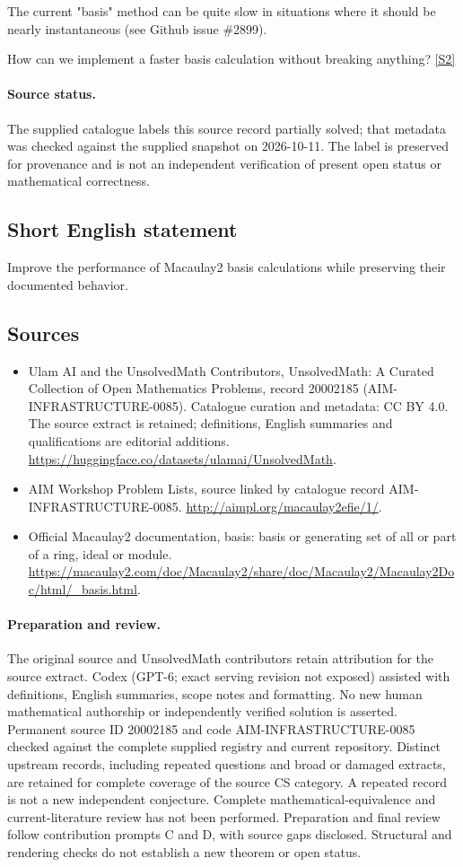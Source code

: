 \documentclass[11pt]{article}
\newcommand{\sref}[2]{\hyperlink{source:#1:#2}{[S#2]}}
\begin{document}
The current "basis" method can be quite slow in situations where it should be nearly instantaneous (see Github issue \#2899).

How can we implement a faster basis calculation without breaking anything? \sref{20002185}{2}
\paragraph{Source status.}
The supplied catalogue labels this source record partially solved; that metadata was checked against the supplied snapshot on 2026-10-11. The label is preserved for provenance and is not an independent verification of present open status or mathematical correctness.
\subsection{Short English statement}
Improve the performance of Macaulay2 basis calculations while preserving their documented behavior.
\subsection{Sources}
\begin{itemize}
\item[\hypertarget{source:20002185:1}{S1}] Ulam AI and the UnsolvedMath Contributors, UnsolvedMath: A Curated Collection of Open Mathematics Problems, record 20002185 (AIM-INFRASTRUCTURE-0085). Catalogue curation and metadata: CC BY 4.0. The source extract is retained; definitions, English summaries and qualifications are editorial additions.
\url{https://huggingface.co/datasets/ulamai/UnsolvedMath}.
\item[\hypertarget{source:20002185:2}{S2}] AIM Workshop Problem Lists, source linked by catalogue record AIM-INFRASTRUCTURE-0085.
\url{http://aimpl.org/macaulay2efie/1/}.
\item[\hypertarget{source:20002185:3}{S3}] Official Macaulay2 documentation, basis: basis or generating set of all or part of a ring, ideal or module.
\url{https://macaulay2.com/doc/Macaulay2/share/doc/Macaulay2/Macaulay2Doc/html/_basis.html}.
\end{itemize}
\paragraph{Preparation and review.}
The original source and UnsolvedMath contributors retain attribution for the source extract. Codex (GPT-6; exact serving revision not exposed) assisted with definitions, English summaries, scope notes and formatting. No new human mathematical authorship or independently verified solution is asserted. Permanent source ID 20002185 and code AIM-INFRASTRUCTURE-0085 checked against the complete supplied registry and current repository. Distinct upstream records, including repeated questions and broad or damaged extracts, are retained for complete coverage of the source CS category. A repeated record is not a new independent conjecture. Complete mathematical-equivalence and current-literature review has not been performed. Preparation and final review follow contribution prompts C and D, with source gaps disclosed. Structural and rendering checks do not establish a new theorem or open status.
\label{end:20002185}
\end{document}
